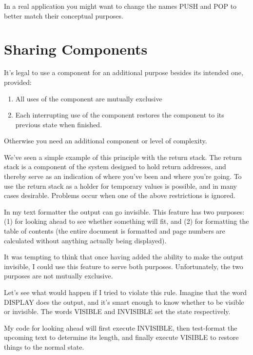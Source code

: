 In a real application you might want to change the names PUSH
and POP to better match their conceptual purposes.

\section{Sharing Components}
\begin{tip}
It's legal to use a component for an additional purpose besides its intended
one, provided:

\begin{enumerate}
\item All uses of the component are mutually exclusive
\item Each interrupting use of the component restores the component to
   its previous state when finished.
\end{enumerate}

Otherwise you need an additional component or level of complexity.
\end{tip}
We've seen a simple example of this principle with the return stack. The
return stack is a component of the \Forth{} system designed to hold
return addresses, and thereby serve as an indication of where you've been
and where you're going. To use the return stack as a holder for temporary
values is possible, and in many cases desirable. Problems occur when one
of the above restrictions is ignored.

In my text formatter the output can go invisible. This feature has
two purposes: (1) for looking ahead to see whether something will fit, and
(2) for formatting the table of contents (the entire document is formatted
and page numbers are calculated without anything actually being
displayed).

It was tempting to think that once having added the ability to make
the output invisible, I could use this feature to serve both purposes.
Unfortunately, the two purposes are not mutually exclusive.

Let's see what would happen if I tried to violate this rule. Imagine
that the word DISPLAY does the output, and it's smart enough to know
whether to be visible or invisible. The words VISIBLE and INVISIBLE
set the state respectively.

My code for looking ahead will first execute INVISIBLE, then
test-format the upcoming text to determine its length, and finally execute
VISIBLE to restore things to the normal state.

